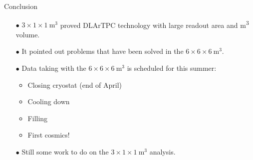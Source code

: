 \documentclass[10pt]{beamer}
\begin{document}
    \begin{frame}{Conclusion}
    	\begin{normalsize}
	    	\begin{itemize}
	    		\item[$\bullet$] $3 \times 1 \times \SI{1}{\meter\cubed}$ proved DLArTPC technology with large readout area and \si{\meter\cubed} volume.
	    		\item[$\bullet$] It pointed out problems that have been solved in the $6 \times 6 \times \SI{6}{\meter\cubed}$.
	    		\item[$\bullet$] Data taking with the $6 \times 6 \times \SI{6}{\meter\cubed}$ is scheduled for this summer:
	    		\begin{itemize}
	    			\item Closing cryostat (end of April)
	    			\item Cooling down
	    			\item Filling
		    		\item First cosmics!
	    		\end{itemize}
	    		\item[$\bullet$] Still some work to do on the $3 \times 1 \times \SI{1}{\meter\cubed}$ analysis.
	    	\end{itemize}
    	\end{normalsize}
    \end{frame}
    
\end{document}
